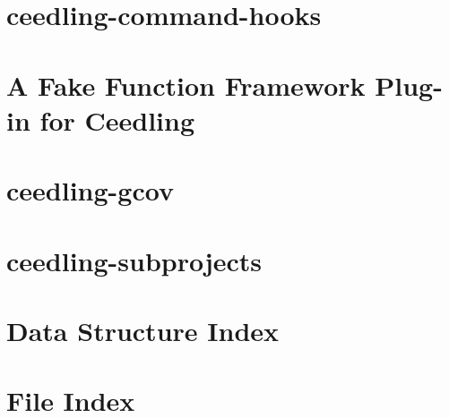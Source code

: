 \let\mypdfximage\pdfximage\def\pdfximage{\immediate\mypdfximage}\documentclass[twoside]{book}
\newcommand{\+}{\discretionary{\mbox{\scriptsize$\hookleftarrow$}}{}{}}
\begin{document}
\chapter{ceedling-\/command-\/hooks}
\label{md__c__mpb_component_mpb_digital_filtering__unit_test_framework_vendor_ceedling_plugins_command_hooks__r_e_a_d_m_e}

\chapter{A Fake Function Framework Plug-\/in for Ceedling}
\label{md__c__mpb_component_mpb_digital_filtering__unit_test_framework_vendor_ceedling_plugins_fake_function_framework__r_e_a_d_m_e}

\chapter{ceedling-\/gcov}
\label{md__c__mpb_component_mpb_digital_filtering__unit_test_framework_vendor_ceedling_plugins_gcov__r_e_a_d_m_e}

\chapter{ceedling-\/subprojects}
\label{md__c__mpb_component_mpb_digital_filtering__unit_test_framework_vendor_ceedling_plugins_subprojects__r_e_a_d_m_e}

\chapter{Data Structure Index}

\chapter{File Index}

\end{document}
